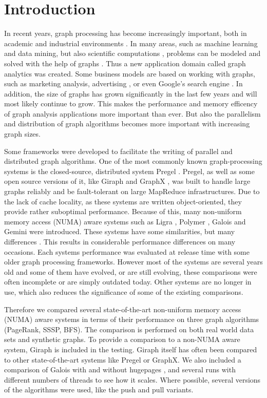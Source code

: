 \section{Introduction}
In recent years, graph processing has become increasingly important, both in academic and industrial environments \cite{Gemini}.
In many areas, such as machine learning and data mining, but also scientific computations , problems can be modeled and solved with the help of graphs \cite{Polymer}.
Thus a new application domain called graph analytics was created.
Some business models are based on working with graphs, such as marketing analysis, advertising , or even Google's search engine \cite{pagerank}.
In addition, the size of graphs has grown significantly in the last few years and will most likely continue to grow.
This makes the performance and memory efficency of graph analysis applications more important than ever.
But also the parallelism and distribution of graph algorithms becomes more important with increasing graph sizes. 

Some frameworks were developed to facilitate the writing of parallel and distributed graph algorithms.
One of the most commonly known graph-processing systems is the closed-source, distributed system Pregel \cite{pregel}.
Pregel, as well as some open source versions of it, like Giraph \cite{Giraph} and GraphX \cite{graphx}, was built to handle large graphs reliably and be fault-tolerant on large MapReduce infrastructures.
Due to the lack of cache locality, as these systems are written object-oriented, they provide rather suboptimal performance.
Because of this, many non-uniform memory access (NUMA) aware systems such as Ligra \cite{Ligra}, Polymer \cite{Polymer}, Galois \cite{Galois} and Gemini \cite{Gemini} were introduced.
These systems have some similarities, but many differences . This results in considerable performance differences on many occasions.
Each systems performance was evaluated at release time with some older graph processing frameworks.
However most of the systems are several years old and some of them have evolved, or are still evolving, these comparisons were often incomplete or are simply outdated today.
Other systems are no longer in use, which also reduces the significance of some of the existing comparisons.

Therefore we compared several state-of-the-art non-uniform memory access (NUMA) aware systems in terms of their performance on three graph algorithms (PageRank, SSSP, BFS).
The comparison is performed on both real world data sets and synthetic graphs.
To provide a comparison to a non-NUMA aware system, Giraph is included in the testing.
Giraph itself has often been compared to other state-of-the-art systems like Pregel or GraphX.
We also included a comparison of Galois with and without hugepages \cite{hugepages}, and several runs with different numbers of threads to see how it scales.
Where possible, several versions of the algorithms were used, like the push and pull variants.

